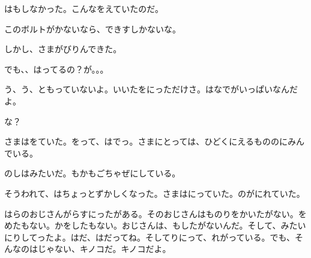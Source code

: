 はもしなかった。こんなをえていたのだ。

このボルトがかないなら、できすしかないな。

しかし、さまがびりんできた。

でも、、はってるの？が。。。

う、う、ともっていないよ。いいたをにっただけさ。はなでがいっぱいなんだよ。

な？

さまはをていた。をって、はでっ。さまにとっては、ひどくにえるもののにみんでいる。

のしはみたいだ。もかもごちゃぜにしている。

そうわれて、はちょっとずかしくなった。さまはにっていた。のがにれていた。

はらのおじさんがらすにったがある。そのおじさんはものりをかいたがない。をめたもない。かをしたもない。おじさんは、もしたがないんだ。そして、みたいにりしてったよ。はだ、はだってね。そしてりにって、れがっている。でも、そんなのはじゃない、キノコだ。キノコだよ。

